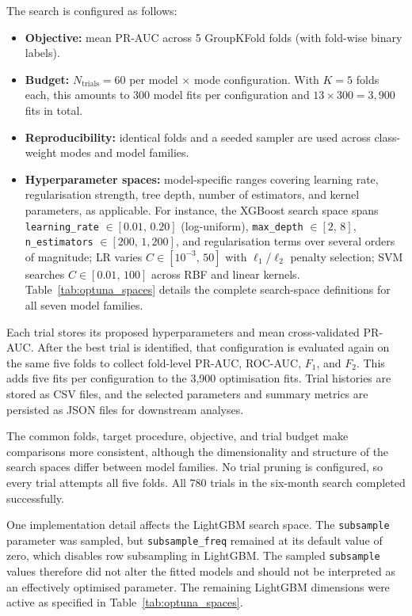 The search is configured as follows:
\begin{itemize}
  \item \textbf{Objective:} mean \gls{PR-AUC} across 5 GroupKFold folds (with fold-wise binary labels).
  \item \textbf{Budget:} $N_{\text{trials}}\!=\!60$ per model $\times$ mode configuration.
    With $K\!=\!5$ folds each, this amounts to 300 model fits per configuration and $13 \times 300 = 3{,}900$ fits in total.
  \item \textbf{Reproducibility:} identical folds and a seeded sampler are used across class-weight modes and model families.
  \item \textbf{Hyperparameter spaces:} model-specific ranges covering learning rate, regularisation strength, tree depth, number of estimators, and kernel parameters, as applicable.
    For instance, the XGBoost search space spans \texttt{learning\_rate} $\in [0.01,\,0.20]$ (log-uniform), \texttt{max\_depth} $\in [2,\,8]$, \texttt{n\_estimators} $\in [200,\,1{,}200]$, and regularisation terms over several orders of magnitude; \gls{LR} varies $C \in [10^{-3},\,50]$ with $\ell_1$/$\ell_2$ penalty selection; \gls{SVM} searches $C \in [0.01,\,100]$ across \gls{RBF} and linear kernels.
    Table~\ref{tab:optuna_spaces} details the complete search-space definitions for all seven model families.
\end{itemize}



Each trial stores its proposed hyperparameters and mean cross-validated PR-AUC. After the best trial is identified, that configuration is evaluated again on the same five folds to collect fold-level PR-AUC, \gls{ROC-AUC}, $F_1$, and $F_2$. This adds five fits per configuration to the 3,900 optimisation fits. Trial histories are stored as \gls{CSV} files, and the selected parameters and summary metrics are persisted as \gls{JSON} files for downstream analyses.

The common folds, target procedure, objective, and trial budget make comparisons more consistent, although the dimensionality and structure of the search spaces differ between model families. No trial pruning is configured, so every trial attempts all five folds. All 780 trials in the six-month search completed successfully.

One implementation detail affects the LightGBM search space. The \texttt{subsample} parameter was sampled, but \texttt{subsample\_freq} remained at its default value of zero, which disables row subsampling in LightGBM. The sampled \texttt{subsample} values therefore did not alter the fitted models and should not be interpreted as an effectively optimised parameter. The remaining LightGBM dimensions were active as specified in Table~\ref{tab:optuna_spaces}.

